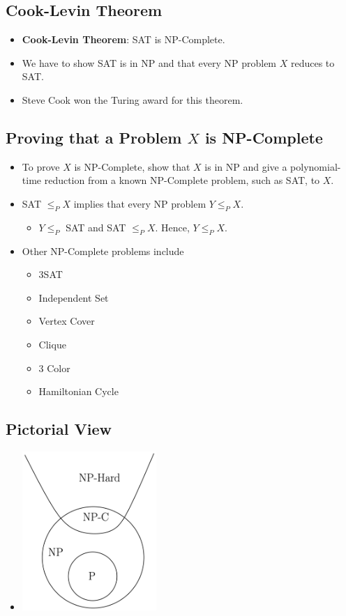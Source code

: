 \documentclass[12pt]{article}
\begin{document}
\subsection{Cook-Levin Theorem}
\begin{itemize}
    \item \textbf{Cook-Levin Theorem}: SAT is NP-Complete.
    \item We have to show SAT is in NP and that every NP problem $X$ reduces to SAT.
    \item Steve Cook won the Turing award for this theorem.
\end{itemize}

\subsection{Proving that a Problem $X$ is NP-Complete}
\begin{itemize}
    \item To prove $X$ is NP-Complete, show that $X$ is in NP and give a polynomial-time reduction from a known NP-Complete problem, such as SAT, to $X$.
    \item SAT $\leq_P X$ implies that every NP problem $Y \leq_P X$.
    \begin{itemize}
        \item $Y \leq_P$ SAT and SAT $\leq _P X$. Hence, $Y \leq_P X$.
    \end{itemize}
    \item Other NP-Complete problems include
    \begin{itemize}
        \item 3SAT
        \item Independent Set
        \item Vertex Cover
        \item Clique
        \item 3 Color
        \item Hamiltonian Cycle
    \end{itemize}
\end{itemize}

\subsection{Pictorial View}
\begin{itemize}
    \item[] \begin{center}
        \includegraphics[width=0.4\textwidth]{images/p-np-complete-hard-diagram.jpg}
    \end{center}
\end{itemize}
\end{document}
